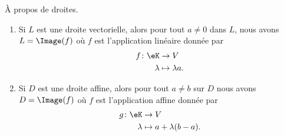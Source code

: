 \begin{lemma}
    À propos de droites.
    \begin{enumerate}
        \item       \label{ITEMooYQCIooOrhRwj}
            Si \( L\) est une droite vectorielle, alors pour tout \( a\neq 0\) dans \( L\), nous avons \( L=\Image(f)\) où \( f\) est l'application linéaire donnée par
            \begin{equation}
                \begin{aligned}
                    f\colon \eK&\to V \\
                    \lambda&\mapsto \lambda a. 
                \end{aligned}
            \end{equation}
        \item       \label{ITEMooZIGMooGruFMP}
            Si \( D\) est une droite affine, alors pour tout \( a\neq b\) sur \( D\) nous avons \( D=\Image(f)\) où \( f\) est l'application affine donnée par
            \begin{equation}
                \begin{aligned}
                    g\colon \eK&\to V \\
                    \lambda&\mapsto a+\lambda(b-a). 
                \end{aligned}
            \end{equation}
    \end{enumerate}
\end{lemma}

